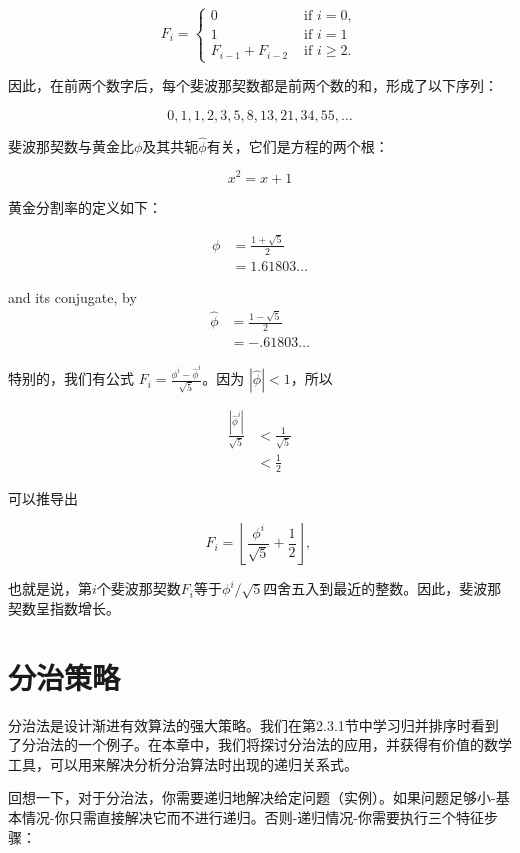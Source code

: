 \documentclass[lang=cn,newtx,10pt,scheme=chinese]{elegantbook}
\begin{document}
$$
F_i= \begin{cases}0 & \text { if } i=0, \\ 1 & \text { if } i=1 \\ F_{i-1}+F_{i-2} & \text { if } i \geq 2 .\end{cases}
$$

因此，在前两个数字后，每个斐波那契数都是前两个数的和，形成了以下序列：

$$
0,1,1,2,3,5,8,13,21,34,55,\ldots
$$

斐波那契数与黄金比$\phi$及其共轭$\hat{\phi}$有关，它们是方程的两个根：

$$
x^2=x+1
$$

黄金分割率的定义如下：

$$
\begin{aligned}
\phi & =\frac{1+\sqrt{5}}{2} \\
& =1.61803 \ldots
\end{aligned}
$$

and its conjugate, by
$$
\begin{aligned}
\widehat{\phi} & =\frac{1-\sqrt{5}}{2} \\
& =-.61803 \ldots
\end{aligned}
$$

特别的，我们有公式 $F_i=\frac{\phi^i-\widehat{\phi}^i}{\sqrt{5}}$。因为 $|\hat{\phi}|<1$，所以

$$
\begin{aligned}
\frac{\left|\hat{\phi}^i\right|}{\sqrt{5}} & <\frac{1}{\sqrt{5}} \\
& <\frac{1}{2}
\end{aligned}
$$

可以推导出

$$
F_i=\left\lfloor\frac{\phi^i}{\sqrt{5}}+\frac{1}{2}\right\rfloor \text {, }
$$

也就是说，第$i$个斐波那契数$F_i$等于$\phi^i / \sqrt{5}$四舍五入到最近的整数。因此，斐波那契数呈指数增长。

\chapter{分治策略}

分治法是设计渐进有效算法的强大策略。我们在第2.3.1节中学习归并排序时看到了分治法的一个例子。在本章中，我们将探讨分治法的应用，并获得有价值的数学工具，可以用来解决分析分治算法时出现的递归关系式。

回想一下，对于分治法，你需要递归地解决给定问题（实例）。如果问题足够小-基本情况-你只需直接解决它而不进行递归。否则-递归情况-你需要执行三个特征步骤：
\end{document}
